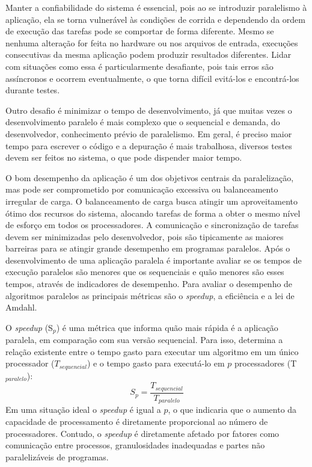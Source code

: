 Manter a confiabilidade do sistema é essencial, pois ao se introduzir paralelismo à aplicação, ela se torna vulnerável às condições de corrida e dependendo da ordem de execução das tarefas pode se comportar de forma diferente. Mesmo se nenhuma alteração for feita no hardware ou nos arquivos de entrada, execuções consecutivas da mesma aplicação podem produzir resultados diferentes. Lidar com situações como essa é particularmente desafiante, pois tais erros são assíncronos e ocorrem eventualmente, o que torna difícil evitá-los e encontrá-los durante testes.

Outro desafio é minimizar o tempo de desenvolvimento, já que muitas vezes o desenvolvimento paralelo é mais complexo que o sequencial e demanda, do desenvolvedor, conhecimento prévio de paralelismo. Em geral, é preciso maior tempo para escrever o código e a depuração é mais trabalhosa, 	diversos testes devem ser feitos no sistema, o que pode dispender maior tempo.

O bom desempenho da aplicação é um dos objetivos centrais da paralelização, mas pode ser comprometido por comunicação excessiva ou balanceamento irregular de carga. O balanceamento de carga busca atingir um aproveitamento ótimo dos recursos do sistema, alocando tarefas de forma a obter o mesmo nível de esforço em todos os processadores.  A comunicação e sincronização de tarefas devem ser minimizadas pelo desenvolvedor, pois são tipicamente as maiores barreiras para se atingir grande desempenho em programas paralelos.
Após o desenvolvimento de uma aplicação paralela é importante avaliar se os tempos de execução paralelos são menores que os sequenciais e quão menores são esses tempos, através de indicadores de desempenho. Para avaliar o desempenho de algoritmos paralelos as principais métricas são o \textit{speedup}, a eficiência e a lei de Amdahl.

O \textit{speedup} (S$_p$) é uma métrica que informa quão mais rápida é a aplicação paralela, em comparação com sua versão sequencial. Para isso, determina a relação existente entre o tempo gasto para executar um algoritmo  em um único processador ($T_{sequencial}$) e o tempo gasto para executá-lo em $p$ processadores (T$_{paralelo}$): 
\[ S_p = \frac{T_{sequencial}}{T_{paralelo}} \]	
Em uma situação ideal o \textit{speedup} é igual a $p$, o que indicaria que o aumento da capacidade de processamento é diretamente proporcional ao número de processadores. 
Contudo,  o \textit{speedup} é diretamente afetado por fatores como comunicação entre processos, granulosidades inadequadas e partes não paralelizáveis de programas.


